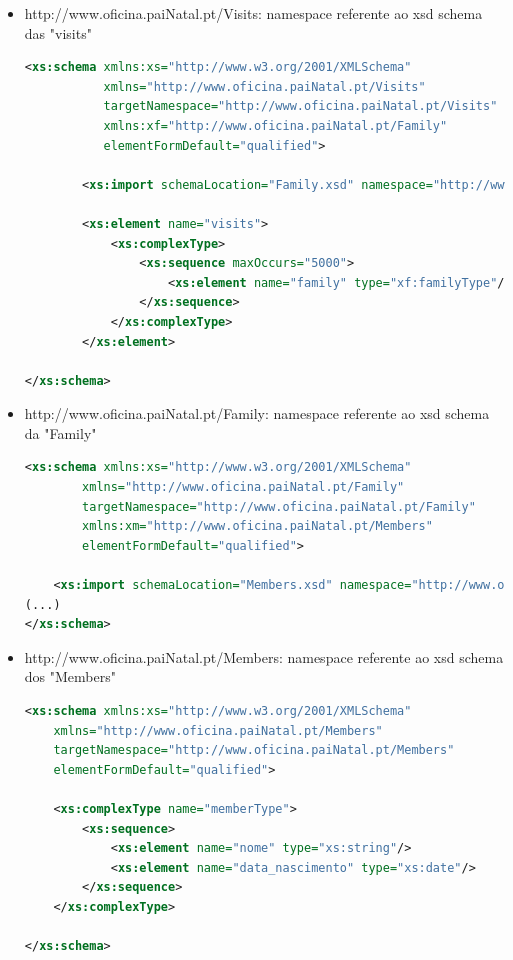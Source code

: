\documentclass{article}
\begin{document}
\begin{itemize}
    \item http://www.oficina.paiNatal.pt/Visits: namespace referente ao xsd schema das "visits"
\begin{lstlisting}[language=XML, caption=XMLSchema Visits]
<xs:schema xmlns:xs="http://www.w3.org/2001/XMLSchema"
           xmlns="http://www.oficina.paiNatal.pt/Visits"
           targetNamespace="http://www.oficina.paiNatal.pt/Visits"
           xmlns:xf="http://www.oficina.paiNatal.pt/Family"
           elementFormDefault="qualified">

        <xs:import schemaLocation="Family.xsd" namespace="http://www.oficina.paiNatal.pt/Family"/>

        <xs:element name="visits">
            <xs:complexType>
                <xs:sequence maxOccurs="5000">
                    <xs:element name="family" type="xf:familyType"/>
                </xs:sequence>
            </xs:complexType>
        </xs:element>

</xs:schema>
\end{lstlisting}
    
    \item http://www.oficina.paiNatal.pt/Family: namespace referente ao xsd schema da "Family"
\begin{lstlisting}[language=XML, caption=XMLSchema Family]
<xs:schema xmlns:xs="http://www.w3.org/2001/XMLSchema" 
        xmlns="http://www.oficina.paiNatal.pt/Family" 
        targetNamespace="http://www.oficina.paiNatal.pt/Family" 
        xmlns:xm="http://www.oficina.paiNatal.pt/Members" 
        elementFormDefault="qualified">

    <xs:import schemaLocation="Members.xsd" namespace="http://www.oficina.paiNatal.pt/Members" />
(...)
</xs:schema>
\end{lstlisting}
    
    \item http://www.oficina.paiNatal.pt/Members: namespace referente ao xsd schema dos "Members"
\begin{lstlisting}[language=XML, caption=XMLSchema Members]
<xs:schema xmlns:xs="http://www.w3.org/2001/XMLSchema"
    xmlns="http://www.oficina.paiNatal.pt/Members"
    targetNamespace="http://www.oficina.paiNatal.pt/Members"
    elementFormDefault="qualified">
    
    <xs:complexType name="memberType">
        <xs:sequence>
            <xs:element name="nome" type="xs:string"/>
            <xs:element name="data_nascimento" type="xs:date"/>
        </xs:sequence>
    </xs:complexType>

</xs:schema>
\end{lstlisting}
\end{itemize}
\end{document}
